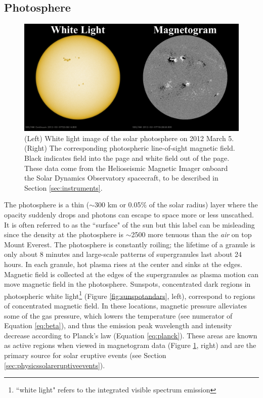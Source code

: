 \subsection{Photosphere}

\begin{figure}[!h]
    \begin{center}
	    \includegraphics[width=\textwidth]{Images/WhiteLightAndMagnetogram.png}
    \end{center}
    \caption[Sunspots and Active Regions]{
        (Left) White light image of the solar photosphere on 2012 March 5. (Right) The corresponding photospheric 
        line-of-sight magnetic field. Black indicates field into the page and white field out of the page. These data
        come from the Helioseismic Magnetic Imager onboard the Solar Dynamics Observatory spacecraft, to be described
        in Section \ref{sec:instruments}. 
    }
    \label{fig:sunspotsandars}
\end{figure}

The photosphere is a thin ($\sim$300 km or 0.05\% of the solar radius) layer where the opacity suddenly drops and photons can escape to space more or less unscathed. It is often referred to as the ``surface" of the sun but this label can be misleading since the density at the photosphere is $\sim$2500 more tenuous than the \textit{air} on top Mount Everest. The photosphere is constantly roiling; the lifetime of a granule is only about 8 minutes and large-scale patterns of supergranules last about 24 hours. In each granule, hot plasma rises at the center and sinks at the edges. Magnetic field is collected at the edges of the supergranules as plasma motion can move magnetic field in the photosphere. Sunspots, concentrated dark regions in photospheric white light\footnote{``white light" refers to the integrated visible spectrum emission} (Figure \ref{fig:sunspotandars}, left), correspond to regions of concentrated magnetic field. In these locations, magnetic pressure alleviates some of the gas pressure, which lowers the temperature (see numerator of Equation \ref{eq:beta}), and thus the emission peak wavelength and intensity decrease according to Planck's law (Equation \ref{eq:planck}). These areas are known as active regions when viewed in magnetogram data (Figure \ref{fig:sunspotsandars}, right) and are the primary source for solar eruptive events (see Section \ref{sec:physicssolareruptiveevents}). 


